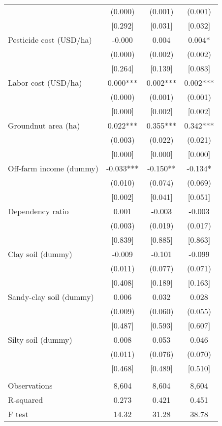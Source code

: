\documentclass[]{article}
\begin{document}
\begin{tabular}{lccc}
 & (0.000) & (0.001) & (0.001) \\
 & [0.292] & [0.031] & [0.032] \\
Pesticide cost (USD/ha) & -0.000 & 0.004 & 0.004* \\
 & (0.000) & (0.002) & (0.002) \\
 & [0.264] & [0.139] & [0.083] \\
Labor cost (USD/ha) & 0.000*** & 0.002*** & 0.002*** \\
 & (0.000) & (0.001) & (0.001) \\
 & [0.000] & [0.002] & [0.002] \\
Groundnut area (ha) & 0.022*** & 0.355*** & 0.342*** \\
 & (0.003) & (0.022) & (0.021) \\
 & [0.000] & [0.000] & [0.000] \\
Off-farm income (dummy) & -0.033*** & -0.150** & -0.134* \\
 & (0.010) & (0.074) & (0.069) \\
 & [0.002] & [0.041] & [0.051] \\
Dependency ratio & 0.001 & -0.003 & -0.003 \\
 & (0.003) & (0.019) & (0.017) \\
 & [0.839] & [0.885] & [0.863] \\
Clay soil (dummy) & -0.009 & -0.101 & -0.099 \\
 & (0.011) & (0.077) & (0.071) \\
 & [0.408] & [0.189] & [0.163] \\
Sandy-clay soil (dummy) & 0.006 & 0.032 & 0.028 \\
 & (0.009) & (0.060) & (0.055) \\
 & [0.487] & [0.593] & [0.607] \\
Silty soil (dummy) & 0.008 & 0.053 & 0.046 \\
 & (0.011) & (0.076) & (0.070) \\
 & [0.468] & [0.489] & [0.510] \\
 &  &  &  \\
Observations & 8,604 & 8,604 & 8,604 \\
R-squared & 0.273 & 0.421 & 0.451 \\
 F test & 14.32 & 31.28 & 38.78 \\ \hline
\end{tabular}
\end{document}

